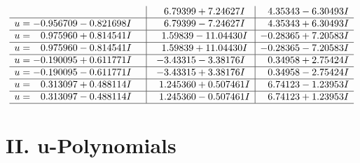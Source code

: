 \documentclass[1p]{elsarticle_modified}
\theoremstyle{definition}
\begin{document}
$$\begin{array}{c|c|c}
 & \phantom{-}6.79399 + 7.24627 I & \phantom{-}4.35343 - 6.30493 I \\ \hline\begin{aligned}
u &= -0.956709 - 0.821698 I\end{aligned}
 & \phantom{-}6.79399 - 7.24627 I & \phantom{-}4.35343 + 6.30493 I \\ \hline\begin{aligned}
u &= \phantom{-}0.975960 + 0.814541 I\end{aligned}
 & \phantom{-}1.59839 - 11.04430 I & -0.28365 + 7.20583 I \\ \hline\begin{aligned}
u &= \phantom{-}0.975960 - 0.814541 I\end{aligned}
 & \phantom{-}1.59839 + 11.04430 I & -0.28365 - 7.20583 I \\ \hline\begin{aligned}
u &= -0.190095 + 0.611771 I\end{aligned}
 & -3.43315 - 3.38176 I & \phantom{-}0.34958 + 2.75424 I \\ \hline\begin{aligned}
u &= -0.190095 - 0.611771 I\end{aligned}
 & -3.43315 + 3.38176 I & \phantom{-}0.34958 - 2.75424 I \\ \hline\begin{aligned}
u &= \phantom{-}0.313097 + 0.488114 I\end{aligned}
 & \phantom{-}1.245360 + 0.507461 I & \phantom{-}6.74123 - 1.23953 I \\ \hline\begin{aligned}
u &= \phantom{-}0.313097 - 0.488114 I\end{aligned}
 & \phantom{-}1.245360 - 0.507461 I & \phantom{-}6.74123 + 1.23953 I\\
 \hline 
 \end{array}$$\newpage
\newpage\renewcommand{\arraystretch}{1}
\centering \section*{ II. u-Polynomials}
\end{document}
